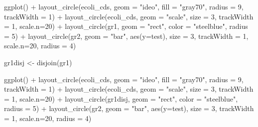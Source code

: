 \documentclass[
]{book}
\newenvironment{Shaded}{\begin{snugshade}}{\end{snugshade}}
\newcommand{\AttributeTok}[1]{\textcolor[rgb]{0.77,0.63,0.00}{#1}}
\newcommand{\DecValTok}[1]{\textcolor[rgb]{0.00,0.00,0.81}{#1}}
\newcommand{\FunctionTok}[1]{\textcolor[rgb]{0.00,0.00,0.00}{#1}}
\newcommand{\NormalTok}[1]{#1}
\newcommand{\OtherTok}[1]{\textcolor[rgb]{0.56,0.35,0.01}{#1}}
\newcommand{\SpecialCharTok}[1]{\textcolor[rgb]{0.00,0.00,0.00}{#1}}
\newcommand{\StringTok}[1]{\textcolor[rgb]{0.31,0.60,0.02}{#1}}
\begin{document}
\begin{Shaded}
\begin{Highlighting}[]
\FunctionTok{ggplot}\NormalTok{() }\SpecialCharTok{+} 
  \FunctionTok{layout\_circle}\NormalTok{(ecoli\_cds, }\AttributeTok{geom =} \StringTok{"ideo"}\NormalTok{, }\AttributeTok{fill =} \StringTok{"gray70"}\NormalTok{, }\AttributeTok{radius =} \DecValTok{9}\NormalTok{, }\AttributeTok{trackWidth =} \DecValTok{1}\NormalTok{) }\SpecialCharTok{+}
  \FunctionTok{layout\_circle}\NormalTok{(ecoli\_cds, }\AttributeTok{geom =} \StringTok{"scale"}\NormalTok{, }\AttributeTok{size =} \DecValTok{3}\NormalTok{, }\AttributeTok{trackWidth =} \DecValTok{1}\NormalTok{, }\AttributeTok{scale.n=}\DecValTok{20}\NormalTok{) }\SpecialCharTok{+}
  \FunctionTok{layout\_circle}\NormalTok{(gr1, }\AttributeTok{geom =} \StringTok{"rect"}\NormalTok{, }\AttributeTok{color =} \StringTok{"steelblue"}\NormalTok{,  }\AttributeTok{radius =} \DecValTok{5}\NormalTok{) }\SpecialCharTok{+}
  \FunctionTok{layout\_circle}\NormalTok{(gr2, }\AttributeTok{geom =} \StringTok{"bar"}\NormalTok{, }\FunctionTok{aes}\NormalTok{(}\AttributeTok{y=}\NormalTok{test), }\AttributeTok{size =} \DecValTok{3}\NormalTok{, }\AttributeTok{trackWidth =} \DecValTok{1}\NormalTok{, }\AttributeTok{scale.n=}\DecValTok{20}\NormalTok{, }\AttributeTok{radius =} \DecValTok{4}\NormalTok{) }
  

\NormalTok{gr1disj }\OtherTok{\textless{}{-}} \FunctionTok{disjoin}\NormalTok{(gr1)}

\FunctionTok{ggplot}\NormalTok{() }\SpecialCharTok{+} 
  \FunctionTok{layout\_circle}\NormalTok{(ecoli\_cds, }\AttributeTok{geom =} \StringTok{"ideo"}\NormalTok{, }\AttributeTok{fill =} \StringTok{"gray70"}\NormalTok{, }\AttributeTok{radius =} \DecValTok{9}\NormalTok{, }\AttributeTok{trackWidth =} \DecValTok{1}\NormalTok{) }\SpecialCharTok{+}
  \FunctionTok{layout\_circle}\NormalTok{(ecoli\_cds, }\AttributeTok{geom =} \StringTok{"scale"}\NormalTok{, }\AttributeTok{size =} \DecValTok{3}\NormalTok{, }\AttributeTok{trackWidth =} \DecValTok{1}\NormalTok{, }\AttributeTok{scale.n=}\DecValTok{20}\NormalTok{) }\SpecialCharTok{+}
  \FunctionTok{layout\_circle}\NormalTok{(gr1disj, }\AttributeTok{geom =} \StringTok{"rect"}\NormalTok{, }\AttributeTok{color =} \StringTok{"steelblue"}\NormalTok{,  }\AttributeTok{radius =} \DecValTok{5}\NormalTok{) }\SpecialCharTok{+}
  \FunctionTok{layout\_circle}\NormalTok{(gr2, }\AttributeTok{geom =} \StringTok{"bar"}\NormalTok{, }\FunctionTok{aes}\NormalTok{(}\AttributeTok{y=}\NormalTok{test), }\AttributeTok{size =} \DecValTok{3}\NormalTok{, }\AttributeTok{trackWidth =} \DecValTok{1}\NormalTok{, }\AttributeTok{scale.n=}\DecValTok{20}\NormalTok{, }\AttributeTok{radius =} \DecValTok{4}\NormalTok{) }
\end{Highlighting}
\end{Shaded}
\end{document}
